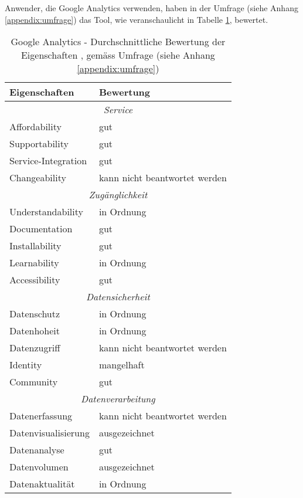 Anwender, die Google Analytics verwenden, haben in der Umfrage (siehe Anhang \ref{appendix:umfrage}) das Tool, wie veranschaulicht in Tabelle \ref{tab: googleanalyticsfeaturebewertung}, bewertet.

\begin{table}[h]
	\centering
	\begin{tabular}{ | p{4cm} | p{10cm} |}
		\hline
    \textbf{Eigenschaften} & \textbf{Bewertung}  \\ \hline
    \multicolumn{2}{|c|}{\textit{Service}}\\ \hline 
    Affordability  &  gut \\ \hline
    Supportability & gut \\ \hline
    Service-Integration & gut \\ \hline
    Changeability  & kann nicht beantwortet werden \\ \hline
    \multicolumn{2}{|c|}{\textit{Zugänglichkeit}}\\ \hline 
    Understandability   & in Ordnung \\ \hline
    Documentation  & gut \\ \hline
    Installability & gut \\ \hline
    Learnability  & in Ordnung \\ \hline
    Accessibility  & gut \\ \hline
    \multicolumn{2}{|c|}{\textit{Datensicherheit}} \\ \hline
    Datenschutz  & in Ordnung \\ \hline
    Datenhoheit & in Ordnung \\ \hline
    Datenzugriff  & kann nicht beantwortet werden \\ \hline
    Identity  & mangelhaft \\  \hline
    Community  & gut \\ \hline
    \multicolumn{2}{|c|}{\textit{Datenverarbeitung}} \\ \hline
    Datenerfassung  & kann nicht beantwortet werden \\  \hline
    Datenvisualisierung & ausgezeichnet \\ \hline
    Datenanalyse & gut \\ \hline
    Datenvolumen & ausgezeichnet \\ \hline
    Datenaktualität  & in Ordnung \\ \hline
	\end{tabular}
	\caption{Google Analytics - Durchschnittliche Bewertung der Eigenschaften \parencite{softwareProcurementEvaluationTable}, \parencite[S. 178]{nakatani2011toolselectionmethod} gemäss Umfrage (siehe Anhang \ref{appendix:umfrage})}
	\label{tab: googleanalyticsfeaturebewertung}
\end{table}

